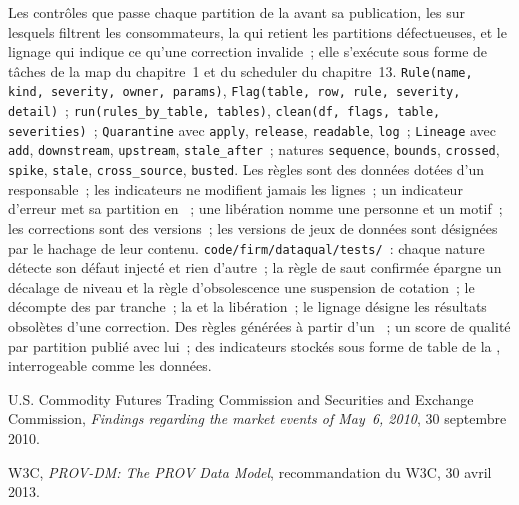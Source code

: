 \begin{build}
 Les contrôles que passe chaque partition de la  avant sa publication, les  sur lesquels filtrent les consommateurs, la
 qui retient les partitions défectueuses, et le lignage qui indique ce qu'une correction invalide~; elle s'exécute sous forme de tâches de la
map du chapitre~1 et du scheduler du chapitre~13.
 \texttt{Rule(name, kind, severity, owner, params)}, \texttt{Flag(table, row, rule, severity, detail)}~;
\texttt{run(rules\_by\_table, tables)}, \texttt{clean(df, flags, table, severities)}~; \texttt{Quarantine} avec \texttt{apply},
\texttt{release}, \texttt{readable}, \texttt{log}~; \texttt{Lineage} avec \texttt{add}, \texttt{downstream}, \texttt{upstream},
\texttt{stale\_after}~; natures \texttt{sequence}, \texttt{bounds}, \texttt{crossed}, \texttt{spike}, \texttt{stale},
\texttt{cross\_source}, \texttt{busted}.
 Les règles sont des données dotées d'un responsable~; les indicateurs ne modifient jamais les lignes~; un indicateur d'erreur met sa partition en ~; une libération nomme une
personne et un motif~; les corrections sont des versions~; les versions de jeux de données sont désignées par le hachage de leur contenu.
 \texttt{code/firm/dataqual/tests/}~: chaque nature détecte son défaut injecté et rien d'autre~; la règle de saut confirmée
épargne un décalage de niveau et la règle d'obsolescence une suspension de cotation~; le décompte des  par tranche~; la  et la libération~; le lignage désigne les
résultats obsolètes d'une correction.
 Des règles générées à partir d'un ~; un score de qualité par partition publié avec lui~; des indicateurs stockés sous forme de table de
la , interrogeable comme les données.
\end{build}

\begin{omsources}
\item U.S. Commodity Futures Trading Commission and Securities and Exchange Commission, \emph{Findings regarding the market events
of May~6, 2010}, 30 septembre 2010.
\item W3C, \emph{PROV-DM: The PROV Data Model}, recommandation du W3C, 30 avril 2013.
\end{omsources}

